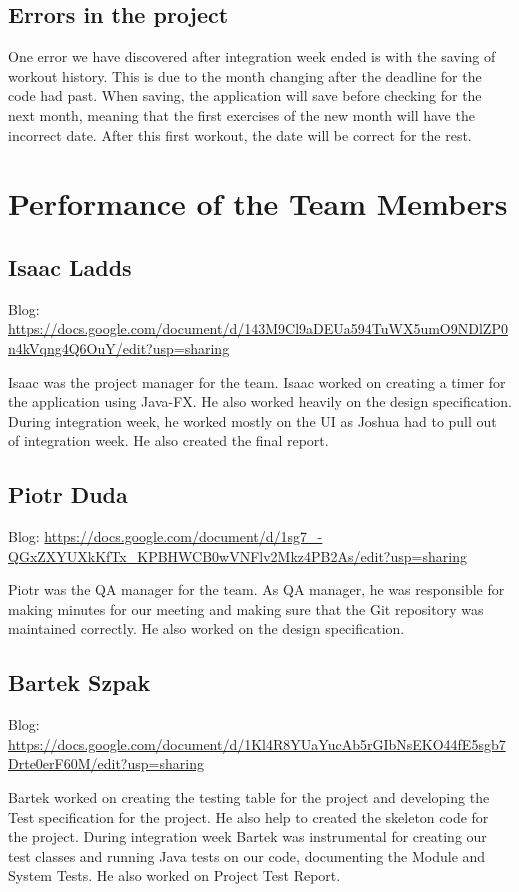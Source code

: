 \documentclass[10pt,a4paper]{article}
\begin{document}
	\subsection{Errors in the project}
	One error we have discovered after integration week ended is with the saving of workout history. This is due to the month changing after the deadline for the code had past. When saving, the application will save before checking for the next month, meaning that the first exercises of the new month will have the incorrect date. After this first workout, the date will be correct for the rest.
	\newpage
	\section{Performance of the Team Members}
	\subsection{Isaac Ladds}
	Blog: \url{https://docs.google.com/document/d/143M9Cl9aDEUa594TuWX5umO9NDlZP0n4kVqng4Q6OuY/edit?usp=sharing} 
	\par
	Isaac was the project manager for the team. Isaac worked on creating a timer for the application using Java-FX. He also worked heavily on the design specification. During integration week, he worked mostly on the UI as Joshua had to pull out of integration week. He also created the final report.
	\subsection{Piotr Duda}
	Blog: \url{https://docs.google.com/document/d/1sg7_-QGxZXYUXkKfTx_KPBHWCB0wVNFlv2Mkz4PB2As/edit?usp=sharing}
	\par
	Piotr was the QA manager for the team. As QA manager, he was responsible for making minutes for our meeting and making sure that the Git repository was maintained correctly. He also worked on the design specification.
	\subsection{Bartek Szpak}
	Blog: \url{https://docs.google.com/document/d/1Kl4R8YUaYucAb5rGIbNsEKO44fE5sgb7Drte0erF60M/edit?usp=sharing}
	\par
	Bartek worked on creating the testing table for the project and developing the Test specification for the project. He also help to created the skeleton code for the project. During integration week Bartek was instrumental for creating our test classes and running Java tests on our code, documenting the Module and System Tests. He also worked on Project Test Report.
\end{document}
